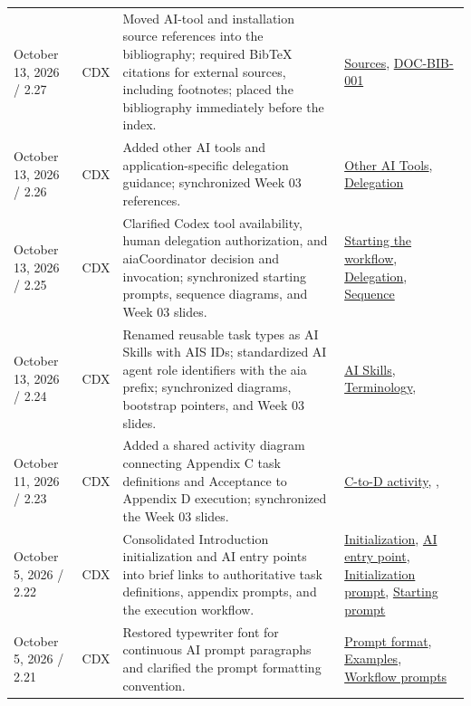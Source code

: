 \begin{tabularx}{\linewidth}{L{3.1cm}L{2.2cm}YL{2.0cm}}
October 13, 2026 / 2.27 & CDX & Moved AI-tool and installation source references into the bibliography; required BibTeX citations for external sources, including footnotes; placed the bibliography immediately before the index. & \hyperref[Section:DocumentBibliography]{Sources}, \hyperref[Requirement:DOCBIB001]{DOC-BIB-001}\\
October 13, 2026 / 2.26 & CDX & Added other AI tools and application-specific delegation guidance; synchronized Week 03 references. & \hyperref[Section:AIOtherTools]{Other AI Tools}, \hyperref[Section:AIAgentDelegation]{Delegation}\\
October 13, 2026 / 2.25 & CDX & Clarified Codex tool availability, human delegation authorization, and aiaCoordinator decision and invocation; synchronized starting prompts, sequence diagrams, and Week 03 slides. & \hyperref[Section:AIImplementationStart]{Starting the workflow}, \hyperref[Section:AIAgentDelegation]{Delegation}, \hyperref[Figure:AIImplementationSequence]{Sequence}\\
October 13, 2026 / 2.24 & CDX & Renamed reusable task types as AI Skills with AIS IDs; standardized AI agent role identifiers with the aia prefix; synchronized diagrams, bootstrap pointers, and Week 03 slides. & \hyperref[Table:AISkills]{AI Skills}, \hyperref[Rule:AITerminologyConsistency]{Terminology}, \\
October 11, 2026 / 2.23 & CDX & Added a shared activity diagram connecting Appendix C task definitions and Acceptance to Appendix D execution; synchronized the Week 03 slides. & \hyperref[Figure:AITaskExecutionActivity]{C-to-D activity}, , \\
October 5, 2026 / 2.22 & CDX & Consolidated Introduction initialization and AI entry points into brief links to authoritative task definitions, appendix prompts, and the execution workflow. & \hyperref[Section:InitializeNewProject]{Initialization}, \hyperref[Section:UsingTemplateAI]{AI entry point}, \hyperref[Section:AIInitializePrompt]{Initialization prompt}, \hyperref[Section:AIStartSelectedTaskPrompt]{Starting prompt}\\
October 5, 2026 / 2.21 & CDX & Restored typewriter font for continuous AI prompt paragraphs and clarified the prompt formatting convention. & \hyperref[Section:AIPromptFormatting]{Prompt format}, \hyperref[Section:AIExamplePrompts]{Examples}, \hyperref[Section:AIImplementationStart]{Workflow prompts}\\

\end{tabularx}
